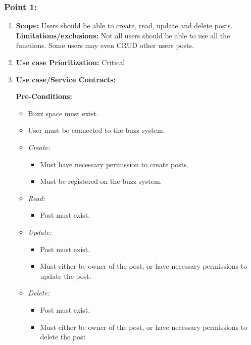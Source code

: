 \documentclass[11pt]{article}
\begin{document}
\subsubsection{Point 1:}
\begin{enumerate}
\item 
\textbf{Scope:}
Users should be able to create, read, update and delete posts.
\newline
\textbf{Limitations/exclusions:} Not all users should be able to use all the functions. Some users may even CRUD other users posts.

\item 
\textbf{Use case Prioritization:} Critical

\item 
\textbf{Use case/Service Contracts:} 

\textbf{Pre-Conditions: }
\begin{itemize}
\item Buzz space must exist.
\item User must be connected to the buzz system.

\item \textit{Create: }
	\begin{itemize}
    	\item Must have necessary permission to create posts.
    	\item Must be registered on the buzz system.
  	\end{itemize}

\item \textit{Read: }
	\begin{itemize}
	\item Post must exist.
	\end{itemize}
	
\item \textit{Update: }
	\begin{itemize}
	\item Post must exist.
	\item Must either be owner of the post, or have necessary 		permissions to update the post.
	\end{itemize}

\item \textit{Delete: }
	\begin{itemize}
	\item Post must exist.
	\item Must either be owner of the post, or have necessary permissions to delete the post
	\end{itemize}
\end{itemize}
 


\end{enumerate}
\end{document}
